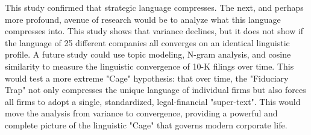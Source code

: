 \documentclass[12pt, letterpaper]{article}
\begin{document}
This study confirmed that strategic language compresses. The next, and perhaps more profound, avenue of research would be to analyze what this language compresses into. This study shows that variance declines, but it does not show if the language of 25 different companies all converges on an identical linguistic profile. A future study could use topic modeling, N-gram analysis, and cosine similarity to measure the linguistic convergence of 10-K filings over time. This would test a more extreme "Cage" hypothesis: that over time, the "Fiduciary Trap" not only compresses the unique language of individual firms but also forces all firms to adopt a single, standardized, legal-financial "super-text". This would move the analysis from variance to convergence, providing a powerful and complete picture of the linguistic "Cage" that governs modern corporate life.


\end{document}
